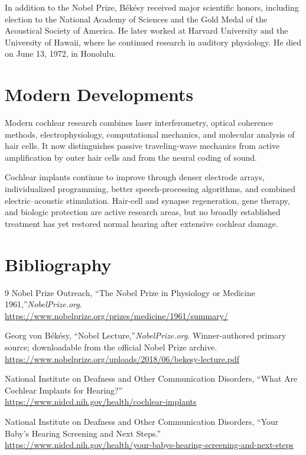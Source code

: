 In addition to the Nobel Prize, B\'ek\'esy received major scientific honors, including election to the National Academy of Sciences and the Gold Medal of the Acoustical Society of America. He later worked at Harvard University and the University of Hawaii, where he continued research in auditory physiology. He died on June 13, 1972, in Honolulu.

\section{Modern Developments}

Modern cochlear research combines laser interferometry, optical coherence methods, electrophysiology, computational mechanics, and molecular analysis of hair cells. It now distinguishes passive traveling-wave mechanics from active amplification by outer hair cells and from the neural coding of sound.

Cochlear implants continue to improve through denser electrode arrays, individualized programming, better speech-processing algorithms, and combined electric--acoustic stimulation. Hair-cell and synapse regeneration, gene therapy, and biologic protection are active research areas, but no broadly established treatment has yet restored normal hearing after extensive cochlear damage.

\section{Bibliography}

\begin{thebibliography}{9}
Nobel Prize Outreach, ``The Nobel Prize in Physiology or Medicine 1961,''\emph{NobelPrize.org}.\\
\url{https://www.nobelprize.org/prizes/medicine/1961/summary/}

Georg von B\'ek\'esy, ``Nobel Lecture,''\emph{NobelPrize.org}. Winner-authored primary source; downloadable from the official Nobel Prize archive.\\
\url{https://www.nobelprize.org/uploads/2018/06/bekesy-lecture.pdf}

National Institute on Deafness and Other Communication Disorders, ``What Are Cochlear Implants for Hearing?''\\
\url{https://www.nidcd.nih.gov/health/cochlear-implants}

National Institute on Deafness and Other Communication Disorders, ``Your Baby's Hearing Screening and Next Steps.''\\
\url{https://www.nidcd.nih.gov/health/your-babys-hearing-screening-and-next-steps}
\end{thebibliography}

